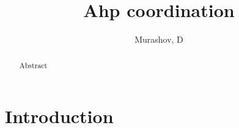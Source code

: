 \documentclass{article}
\author{Murashov, D}
\title{Ahp coordination}
\begin{document}
    \maketitle

    \begin{abstract}
        Abstract
    \end{abstract}

    \section{Introduction}

    

    \medskip

    

    
\end{document}
